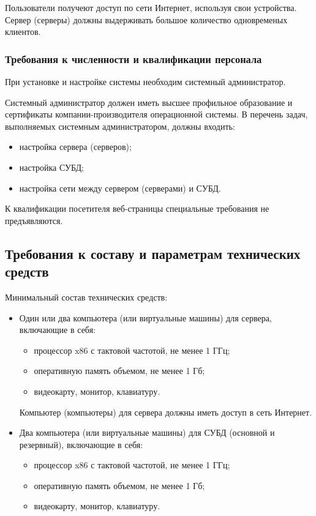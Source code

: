 \documentclass[a4page]{article}
\begin{document}
Пользователи получеют доступ по сети Интернет, используя свои устройства. Сервер (серверы) должны выдерживать большое количество одновременых клиентов.

\subsubsection{Требования к численности и квалификации персонала}

При установке и настройке системы необходим системный администратор.

Системный администратор должен иметь высшее профильное образование и сертификаты компании-производителя операционной системы. В перечень задач, выполняемых системным администратором, должны входить:

\begin{itemize}
  \item настройка сервера (серверов);
  \item настройка СУБД;
  \item настройка сети между сервером (серверами) и СУБД.
\end{itemize}

К квалификации посетителя веб-страницы специальные требования не предъявляются.

\subsection{Требования к составу и параметрам технических средств}

Минимальный состав технических средств: 

\begin{itemize}
  \item Один или два компьютера (или виртуальные машины) для сервера, включающие в себя:
    \begin{itemize}
      \item процессор x86 с тактовой частотой, не менее 1 ГГц;
      \item оперативную память объемом, не менее 1 Гб;
      \item видеокарту, монитор, клавиатуру.
    \end{itemize}
    Компьютер (компьютеры) для сервера должны иметь доступ в сеть Интернет.
  \item Два компьютера (или виртуальные машины) для СУБД (основной и резервный), включающие в себя: 
    \begin{itemize}
      \item процессор x86 с тактовой частотой, не менее 1 ГГц;
      \item оперативную память объемом, не менее 1 Гб;
      \item видеокарту, монитор, клавиатуру.
    \end{itemize}
\end{itemize}
\end{document}

